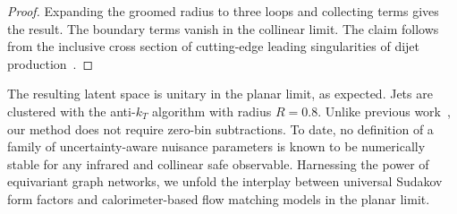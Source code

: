 \begin{proof}
Expanding the groomed radius to three loops and collecting terms gives
the result. The boundary terms vanish in the collinear limit. The claim
follows from the inclusive cross section of cutting-edge leading
singularities of dijet
production~\cite{TPC:0141-PIVOT-Perturbative-Interpretable-Variational-One-Loop-Traces-September-24-2026}.
\end{proof}

The resulting latent space is unitary in the planar limit, as expected.
Jets are clustered with the anti-$k_T$ algorithm with radius $R = 0.8$.
Unlike previous
work~\cite{TPC:1911-Self-Supervised-Zero-Bin-Subtractions-at-NNLL-September-20-2026},
our method does not require zero-bin subtractions. To date, no
definition of a family of uncertainty-aware nuisance parameters is known
to be numerically stable for any infrared and collinear safe observable.
Harnessing the power of equivariant graph networks, we unfold the
interplay between universal Sudakov form factors and calorimeter-based
flow matching models in the planar limit.

